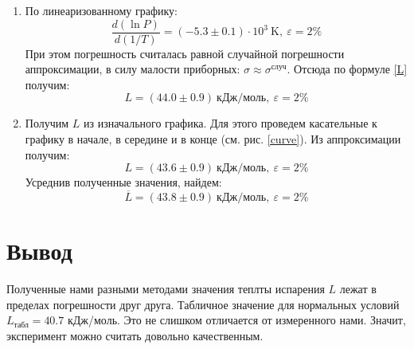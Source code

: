 \documentclass[12pt]{article}
\begin{document}
\begin{enumerate}
        \item По линеаризованному графику:
        $$
        \frac{d(\ln P)}{d(1/T)} = (-5.3 \pm 0.1)\cdot 10^3\ \text{K}, \ \varepsilon = 2\%
        $$
        При этом погрешность считалась равной случайной погрешности аппроксимации, в силу
        малости приборных: $\sigma \approx \sigma^{\text{случ}}$.
        Отсюда по формуле \ref{L} получим:
        $$
        L = (44.0 \pm 0.9)\ \text{кДж} / \text{моль},\ \varepsilon = 2\%
        $$

        \item Получим $L$ из изначального графика. Для этого проведем касательные к графику
        в начале, в середине и в конце (см. рис. \ref{curve}). Из аппроксимации получим:
        $$
        L = (43.6\pm 0.9)\ \text{кДж} / \text{моль},\ \varepsilon = 2\%
        $$
        Усреднив полученные значения, найдем:
        $$
        \overline{L} = (43.8 \pm 0.9)\ \text{кДж}/\text{моль},\ \varepsilon = 2\%
        $$
    \end{enumerate}

    \section{Вывод}
    Полученные нами разными методами значения теплты испарения $L$ лежат
    в пределах погрешности друг друга. Табличное значение для нормальных
    условий $L_{\text{табл}} = 40.7$ кДж/моль. Это не слишком отличается
    от измеренного нами. Значит, эксперимент можно считать довольно
    качественным.
\end{document}
